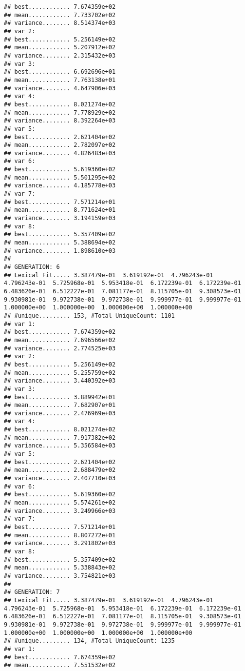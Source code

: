 \documentclass[]{article}
\begin{document}
\begin{verbatim}
## best............ 7.674359e+02
## mean............ 7.733702e+02
## variance........ 8.514374e+03
## var 2:
## best............ 5.256149e+02
## mean............ 5.207912e+02
## variance........ 2.315432e+03
## var 3:
## best............ 6.692696e+01
## mean............ 7.763138e+01
## variance........ 4.647906e+03
## var 4:
## best............ 8.021274e+02
## mean............ 7.778929e+02
## variance........ 8.392264e+03
## var 5:
## best............ 2.621404e+02
## mean............ 2.782097e+02
## variance........ 4.826483e+03
## var 6:
## best............ 5.619360e+02
## mean............ 5.501295e+02
## variance........ 4.185778e+03
## var 7:
## best............ 7.571214e+01
## mean............ 8.771624e+01
## variance........ 3.194159e+03
## var 8:
## best............ 5.357409e+02
## mean............ 5.388694e+02
## variance........ 1.898610e+03
## 
## GENERATION: 6
## Lexical Fit..... 3.387479e-01  3.619192e-01  4.796243e-01  4.796243e-01  5.725968e-01  5.953418e-01  6.172239e-01  6.172239e-01  6.483626e-01  6.512227e-01  7.081177e-01  8.115705e-01  9.308573e-01  9.930981e-01  9.972738e-01  9.972738e-01  9.999977e-01  9.999977e-01  1.000000e+00  1.000000e+00  1.000000e+00  1.000000e+00  
## #unique......... 153, #Total UniqueCount: 1101
## var 1:
## best............ 7.674359e+02
## mean............ 7.696566e+02
## variance........ 2.774525e+03
## var 2:
## best............ 5.256149e+02
## mean............ 5.255759e+02
## variance........ 3.440392e+03
## var 3:
## best............ 3.889942e+01
## mean............ 7.682907e+01
## variance........ 2.476969e+03
## var 4:
## best............ 8.021274e+02
## mean............ 7.917382e+02
## variance........ 5.356584e+03
## var 5:
## best............ 2.621404e+02
## mean............ 2.688479e+02
## variance........ 2.407710e+03
## var 6:
## best............ 5.619360e+02
## mean............ 5.574261e+02
## variance........ 3.249966e+03
## var 7:
## best............ 7.571214e+01
## mean............ 8.807272e+01
## variance........ 3.291802e+03
## var 8:
## best............ 5.357409e+02
## mean............ 5.338843e+02
## variance........ 3.754821e+03
## 
## GENERATION: 7
## Lexical Fit..... 3.387479e-01  3.619192e-01  4.796243e-01  4.796243e-01  5.725968e-01  5.953418e-01  6.172239e-01  6.172239e-01  6.483626e-01  6.512227e-01  7.081177e-01  8.115705e-01  9.308573e-01  9.930981e-01  9.972738e-01  9.972738e-01  9.999977e-01  9.999977e-01  1.000000e+00  1.000000e+00  1.000000e+00  1.000000e+00  
## #unique......... 134, #Total UniqueCount: 1235
## var 1:
## best............ 7.674359e+02
## mean............ 7.551532e+02

\end{verbatim}
\end{document}
